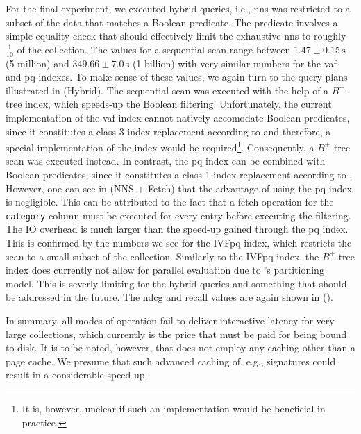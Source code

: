 For the final experiment, we executed hybrid queries, i.e., \acrshort{nns} was restricted to a subset of the data that matches a Boolean predicate. The predicate involves a simple equality check that should effectively limit the exhaustive \acrshort{nns} to roughly $\frac{1}{10}$ of the collection. The values for a sequential scan range between $1.47 \pm 0.15 \, \si{\second}$ (5 million) and $349.66 \pm 7.0 \, \si{\second}$ (1 billion) with very similar numbers for the \acrshort{vaf} and \acrshort{pq} indexes. To make sense of these values, we again turn to the query plans illustrated in  (Hybrid). The sequential scan was executed with the help of a $B^{+}$-tree index, which speeds-up the Boolean filtering. Unfortunately, the current implementation of the \acrshort{vaf} index cannot natively accomodate Boolean predicates, since it constitutes a class 3 index replacement according to  and therefore, a special implementation of the index would be required\footnote{It is, however, unclear if such an implementation would be beneficial in practice.}. Consequently, a $B^{+}$-tree scan was executed instead. In contrast, the \acrshort{pq} index can be combined with Boolean predicates, since it constitutes a class 1 index replacement according to . However, one can see in  (NNS + Fetch) that the advantage of using the \acrshort{pq} index is negligible.
This can be attributed to the fact that a fetch operation for the \texttt{category} column must be executed for every entry before executing the filtering. The IO overhead is much larger than the speed-up gained through the \acrshort{pq} index. This is confirmed by the numbers we see for the IVF\acrshort{pq} index, which restricts the scan to a small subset of the collection. Similarly to the IVF\acrshort{pq} index, the $B^{+}$-tree index does currently not allow for parallel evaluation due to \cottontail{}'s partitioning model. This is severly limiting for the hybrid queries and something that should be addressed in the future. The n\acrshort{dcg} and recall values are again shown in  ().

In summary, all modes of operation fail to deliver interactive latency for very large collections, which currently is the price that must be paid for being bound to disk. It is to be noted, however, that \cottontail{} does not employ any caching other than a page cache. We presume that such advanced caching of, e.g., signatures could result in a considerable speed-up.

